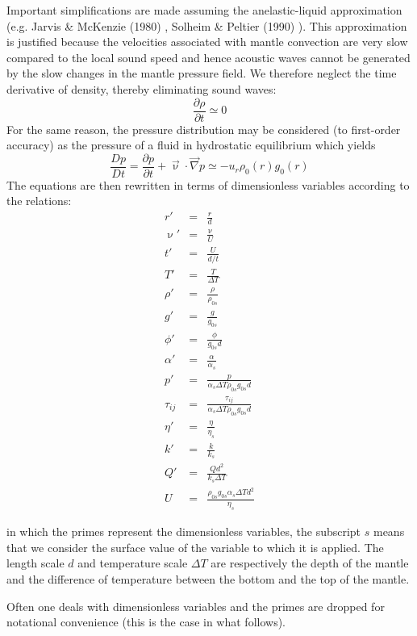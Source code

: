 Important simplifications are made assuming the anelastic-liquid approximation 
(e.g. Jarvis \& McKenzie (1980) \cite{jamc80}, Solheim \& Peltier (1990) \cite{sope90}).
This approximation is justified because the velocities associated with mantle convection 
are very slow compared to the local sound speed and
hence acoustic waves cannot be generated by the slow changes in the mantle pressure field. 
We therefore neglect the time derivative of density, thereby eliminating sound waves:
\[
\frac{\partial \rho}{\partial t} \simeq 0
\] 
For the same reason, the pressure distribution may be considered (to first-order accuracy) 
as the pressure of a fluid in hydrostatic equilibrium which yields
\[
\frac{Dp}{Dt} = \frac{\partial p}{\partial t} + \vec\upnu\cdot\vec\nabla p 
\simeq
- u_r \rho_0(r) g_0(r)
\]
The equations are then rewritten in terms of dimensionless variables according to the relations:
\begin{eqnarray}
r'&=&\frac{r}{d} \\
\upnu' &=& \frac{\upnu}{U} \\
t' &=& \frac{U}{d/t} \\
T' &=& \frac{T}{\Delta T} \\
\rho' &=& \frac{\rho}{\rho_{0s}} \\
g' &=& \frac{g}{g_{0s}} \\
\phi' &=& \frac{\phi}{g_{0s}d} \\
\alpha' &=& \frac{\alpha}{\alpha_s} \\
p' &=& \frac{p}{\alpha_s \Delta T \rho_{0s} g_{0s} d} \\
\tau_{ij} &=& \frac{\tau_{ij}}{\alpha_s \Delta T \rho_{0s} g_{0s} d} \\
\eta' &=& \frac{\eta}{\eta_s} \\
k' &=& \frac{k}{k_s} \\
Q' &=& \frac{Q d^2}{k_s \Delta T} \\
U &=& \frac{\rho_{0s}g_{0s}\alpha_s \Delta T d^2}{\eta_s}
\end{eqnarray}

in which the primes represent the dimensionless variables, the subscript $s$ means 
that we consider the surface value of the variable to which it
is applied. The length scale $d$ and temperature scale $\Delta T$ are respectively 
the depth of the mantle and the difference of temperature between
the bottom and the top of the mantle. 

Often one deals with dimensionless variables and the primes
are dropped for notational convenience (this is the case in what follows).

